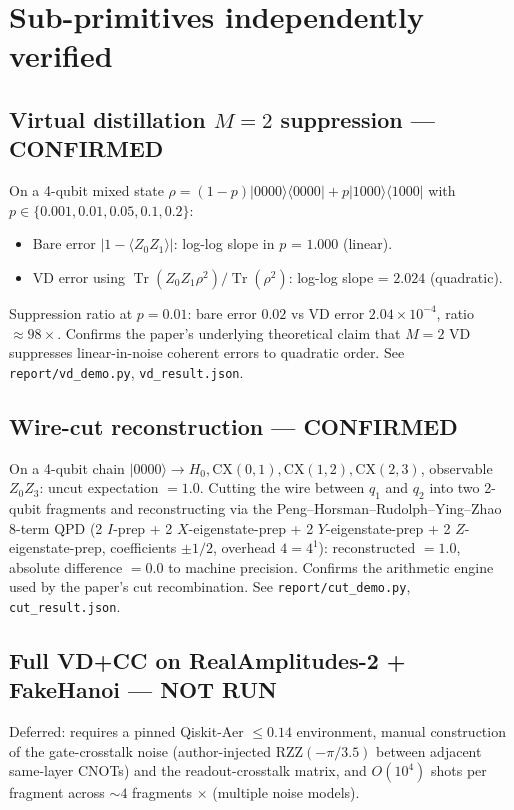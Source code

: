 \documentclass[11pt]{article}
\begin{document}
\section{Sub-primitives independently verified}

\subsection{Virtual distillation $M=2$ suppression --- CONFIRMED}
On a 4-qubit mixed state
$\rho = (1-p)\lvert 0000\rangle\!\langle 0000\rvert + p\lvert 1000\rangle\!\langle 1000\rvert$
with $p \in \{0.001, 0.01, 0.05, 0.1, 0.2\}$:
\begin{itemize}
  \item Bare error $|1 - \langle Z_0 Z_1\rangle|$: log-log slope in $p$ = $\mathbf{1.000}$ (linear).
  \item VD error using $\operatorname{Tr}(Z_0Z_1\rho^2)/\operatorname{Tr}(\rho^2)$: log-log slope = $\mathbf{2.024}$ (quadratic).
\end{itemize}
Suppression ratio at $p=0.01$: bare error $0.02$ vs VD error $2.04\times 10^{-4}$, ratio $\approx 98\times$. Confirms the paper's underlying theoretical claim that $M=2$ VD suppresses linear-in-noise coherent errors to quadratic order. See \texttt{report/vd\_demo.py}, \texttt{vd\_result.json}.

\subsection{Wire-cut reconstruction --- CONFIRMED}
On a 4-qubit chain $\lvert 0000\rangle \to H_0, \mathrm{CX}(0,1), \mathrm{CX}(1,2), \mathrm{CX}(2,3)$, observable $Z_0 Z_3$: uncut expectation $= 1.0$. Cutting the wire between $q_1$ and $q_2$ into two 2-qubit fragments and reconstructing via the Peng--Horsman--Rudolph--Ying--Zhao 8-term QPD (2 $I$-prep + 2 $X$-eigenstate-prep + 2 $Y$-eigenstate-prep + 2 $Z$-eigenstate-prep, coefficients $\pm 1/2$, overhead $4 = 4^1$): reconstructed $= 1.0$, absolute difference $= 0.0$ to machine precision. Confirms the arithmetic engine used by the paper's cut recombination. See \texttt{report/cut\_demo.py}, \texttt{cut\_result.json}.

\subsection{Full VD+CC on RealAmplitudes-2 + FakeHanoi --- NOT RUN}
Deferred: requires a pinned Qiskit-Aer $\le 0.14$ environment, manual construction of the gate-crosstalk noise (author-injected $\mathrm{RZZ}(-\pi/3.5)$ between adjacent same-layer CNOTs) and the readout-crosstalk matrix, and $O(10^4)$ shots per fragment across $\sim 4$ fragments $\times$ (multiple noise models).
\end{document}
